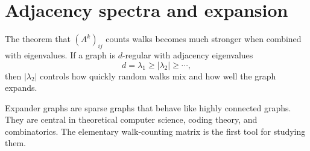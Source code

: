 \section{Adjacency spectra and expansion}

The theorem that $(A^k)_{ij}$ counts walks becomes much stronger when combined with eigenvalues.  If a graph is $d$-regular with adjacency eigenvalues
\[
  d=\lambda_1\ge |\lambda_2|\ge\cdots,
\]
then $|\lambda_2|$ controls how quickly random walks mix and how well the graph expands.

Expander graphs are sparse graphs that behave like highly connected graphs.  They are central in theoretical computer science, coding theory, and combinatorics.  The elementary walk-counting matrix is the first tool for studying them.
